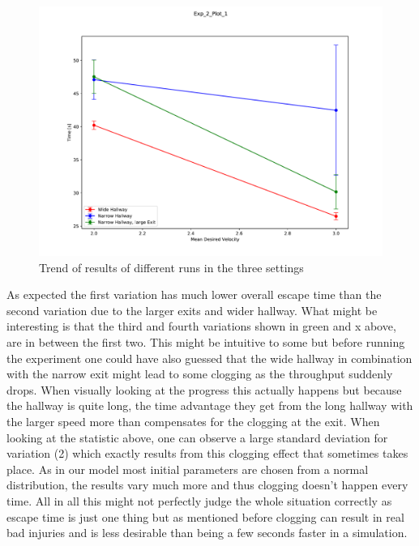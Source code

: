 \documentclass[11pt]{article}
\begin{document}
\begin{figure}[H]
	\centering
	\includegraphics[width=1\linewidth]{assets/Exp_2_Plot_1}\\
	Trend of results of different runs in the three settings
\end{figure}

As expected the first variation has much lower overall escape time than the second variation due to the larger exits and wider hallway. What might be interesting is that the third and fourth variations shown in green and x above, are in between the first two. This might be intuitive to some but before running the experiment one could have also guessed that the wide hallway in combination with the narrow exit might lead to some clogging as the throughput suddenly drops. When visually looking at the progress this actually happens but because the hallway is quite long, the time advantage they get from the long hallway with the larger speed more than compensates for the clogging at the exit. When looking at the statistic above, one can observe a large standard deviation for variation (2) which exactly results from this clogging effect that sometimes takes place. As in our model most initial parameters are chosen from a normal distribution, the results vary much more and thus clogging doesn't happen every time. All in all this might not perfectly judge the whole situation correctly as escape time is just one thing but as mentioned before clogging can result in real bad injuries and is less desirable than being a few seconds faster in a simulation.
\end{document}
